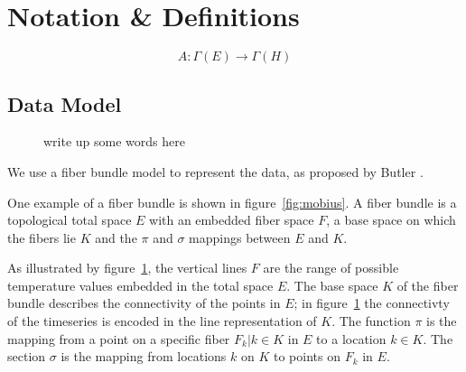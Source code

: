 \documentclass[../main.tex]{subfiles}
\begin{document}
\section{Notation \& Definitions}

\begin{equation}
    A: \Gamma(E) \rightarrow \Gamma(H)
\end{equation}


\subsection{Data Model}
\begin{figure}[ht]
    \caption{write up some words here}
    \label{fig:fiberbundle}
\end{figure}

We use a fiber bundle model to represent the data, as proposed by Butler 
\cite{butlerVectorBundleClassesForm1992,butlerVisualizationModelBased1989}. 


One example of a fiber bundle is shown in figure~\ref{fig:mobius}. A fiber bundle is a topological total space $E$ with an embedded fiber space $F$, a base space on which the fibers lie $K$ and the $\pi$ and $\sigma$ mappings between $E$ and $K$. 


As illustrated by figure~\ref{fig:fiberbundle}, the vertical lines $F$ are the range of possible temperature values embedded in the total space $E$. The base space $K$ of the fiber bundle describes the connectivity of the points in $E$; in figure~\ref{fig:fiberbundle} the connectivty of the timeseries is encoded in the line representation of $K$. The function $\pi$ is the mapping from a point on a specific fiber $F_{k}|k\in K$ in $E$ to a location $k \in K$. 
The section $\sigma$ is the mapping from locations $k$ on $K$ to points on $F_{k}$ in $E$.
\end{document}
